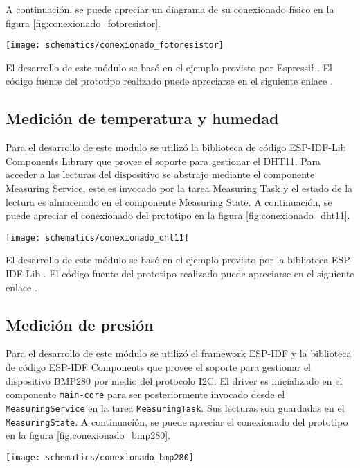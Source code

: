 A continuación, se puede apreciar un diagrama de su conexionado físico en la figura \ref{fig:conexionado_fotoresistor}.

\begin{center}
\texttt{[image: schematics/conexionado\_fotoresistor]}
  \label{fig:conexionado_fotoresistor}
\end{center}

El desarrollo de este módulo se basó en el ejemplo provisto por Espressif \cite{ESP32_ADC1_Example}. El código fuente del prototipo realizado puede apreciarse en el siguiente enlace \cite{ESP32_POC_photoresistor}.

\subsection{Medición de temperatura y humedad}

Para el desarrollo de este modulo se utilizó la biblioteca de código ESP-IDF-Lib Components Library \cite{esp_idf_lib_website} que provee el soporte para gestionar el DHT11. Para acceder a las lecturas del dispositivo se abstrajo mediante el componente Measuring Service, este es invocado por la tarea Measuring Task y el estado de la lectura es almacenado en el componente Measuring State.
A continuación, se puede apreciar el conexionado del prototipo en la figura \ref{fig:conexionado_dht11}.

\begin{center}
\texttt{[image: schematics/conexionado\_dht11]}
  \label{fig:conexionado_dht11}
\end{center}

El desarrollo de este módulo se basó en el ejemplo provisto por la biblioteca ESP-IDF-Lib \cite{ESP32_dht11_example}. El código fuente del prototipo realizado puede apreciarse en el siguiente enlace \cite{ESP32_POC_dht11}.

\subsection{Medición de presión}
Para el desarrollo de este módulo se utilizó el framework ESP-IDF y la biblioteca de código ESP-IDF Components que provee el soporte para gestionar el dispositivo BMP280 por medio del protocolo I2C. El driver es inicializado en el componente \verb|main-core| para ser posteriormente invocado desde el \verb|MeasuringService| en la tarea \verb|MeasuringTask|. Sus lecturas son guardadas en el \verb|MeasuringState|. A continuación, se puede apreciar el conexionado del prototipo en la figura \ref{fig:conexionado_bmp280}.
\begin{center}
\texttt{[image: schematics/conexionado\_bmp280]}
  \label{fig:conexionado_bmp280}
\end{center}

